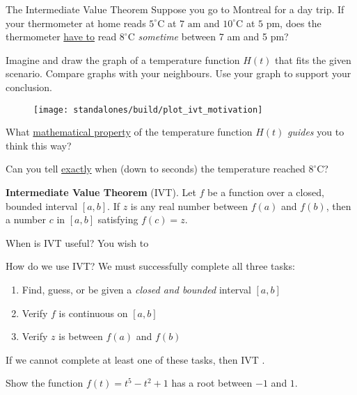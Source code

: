 \documentclass[../main.tex]{subfiles}
\begin{document}
\begin{lesson}{The Intermediate Value Theorem}
  \faComments{} Suppose you go to Montreal for a day trip. If your thermometer at home reads \(5^{\circ}\)C at \(7 \text{ am}\) and \({10}^{\circ}\)C at \(5\text{ pm}\), does the thermometer \underline{have to} read \({8}^{\circ}\)C \emph{sometime} between 7 am and 5 pm?


  Imagine and draw the graph of a temperature function \(H(t)\) that fits the given scenario. Compare graphs with your neighbours. Use your graph to support your conclusion.

  \begin{figure}[!h]  %
    \centering
    \texttt{[image: standalones/build/plot\_ivt\_motivation]}
    \label{fig:label}
  \end{figure}

  What \underline{mathematical property} of the temperature function \(H(t)\) \emph{guides} you to think this way?

  Can you tell \underline{exactly} when (down to seconds) the temperature reached \(8^{\circ}\)C?
  \clearpage

  \begin{mdframed}[style=withref]
    \textbf{Intermediate Value Theorem} (IVT). 
    Let \(f\) be a \underline{\hspace{1in}} function over a closed, bounded interval \([a,b]\). If \(z\) is any real number between \(f(a)\) and \(f(b)\), then \underline{\hspace{1in}} a number \(c\) in \([a,b]\) satisfying \(f(c) = z\).

  \end{mdframed}

  When is IVT useful? You wish to 

  \medskip
  How do we use IVT? We must successfully complete all three tasks: 
  \begin{enumerate}[label=(IVT \arabic*)]
    \item Find, guess, or be given {a \emph{closed and bounded} interval \([a,b]\)}
    \item Verify {\(f\) is continuous on \([a,b]\)}
    \item Verify {\(z\) is between \(f(a)\) and \(f(b)\)}
  \end{enumerate}
  If we cannot complete at least one of these tasks, then IVT .
  \bigskip

  \begin{example}
    Show the function \(f(t) = t^{5} - t^{2} + 1\) has a root between \(-1\) and \(1\).
  \end{example}
\end{lesson}
\end{document}
